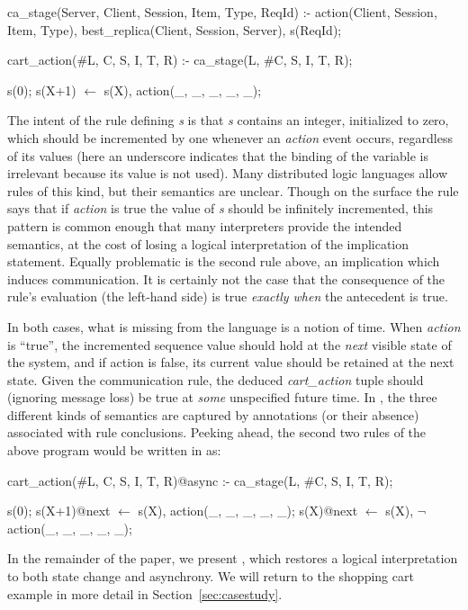 \begin{Dedalus}
ca_stage(Server, Client, Session, Item, Type, ReqId) :-
  action(Client, Session, Item, Type),
  best_replica(Client, Session, Server),
  s(ReqId);

cart_action(#L, C, S, I, T, R) :-
  ca_stage(L, #C, S, I, T, R);

s(0);
s(X+1) \(\leftarrow\)  s(X), action(_, _, _, _, _);

\end{Dedalus}


The intent of the rule defining {\em s} is that \emph{s} contains an integer, initialized to
zero, which should be incremented by one whenever an {\em action} event occurs,
regardless of its values (here an underscore indicates that the binding of the variable
is irrelevant because its value is not used).  
Many distributed logic languages allow rules of this kind,
but their semantics are unclear.  Though on the surface the rule says that if {\em action} is true
the value of {\em s} should be infinitely incremented, this pattern is common enough
that many interpreters provide the intended semantics, at the cost of losing a logical
interpretation of the implication statement.  Equally problematic is the second rule above,
an implication which induces communication.  It is certainly not the case that the consequence of the rule's evaluation (the left-hand side) is true {\em exactly when} the antecedent is
true.  

In both cases, what is missing from the language is a notion of time.  When {\em action} is ``true'',
the incremented sequence value should
hold at the {\em next} visible state of the system, and if action is false, its current
value should be retained at the next state.  Given the communication rule, 
the deduced {\em cart\_action}
tuple should (ignoring message loss) be true at {\em some} unspecified future time.  In \lang,
the three different kinds of semantics are captured by annotations (or their absence) 
associated with rule conclusions.  Peeking ahead, the second two rules of the above program would be written in \lang as:

\begin{Dedalus}
cart_action(#L, C, S, I, T, R)@async :-
  ca_stage(L, #C, S, I, T, R);

s(0);
s(X+1)@next \(\leftarrow\)  s(X), action(_, _, _, _, _);
s(X)@next \(\leftarrow\)  s(X), \(\lnot\) action(_, _, _, _, _);
\end{Dedalus}

In the remainder of the paper, we present \lang, which restores a logical interpretation to
both state change and asynchrony.  We will return to the shopping cart example in more detail 
in Section~\ref{sec:casestudy}.

